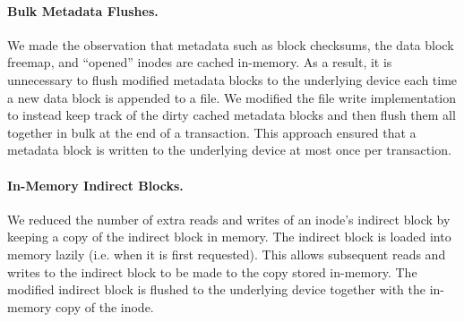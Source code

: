 \paragraph{Bulk Metadata Flushes.}
We made the observation that metadata such as block checksums, the data
block freemap, and ``opened'' inodes are cached in-memory. As a result, it is
unnecessary to flush modified metadata blocks to the underlying device each
time a new data block is appended to a file. We modified the file write
implementation to instead keep track of the dirty cached metadata blocks and
then flush them all together in bulk at the end of a transaction. This approach
ensured that a metadata block is written to the underlying device at most once
per transaction.

\paragraph{In-Memory Indirect Blocks.}
We reduced the number of extra reads and writes of an inode's indirect block by
keeping a copy of the indirect block in memory. The indirect block is loaded
into memory lazily (i.e. when it is first requested). This allows subsequent
reads and writes to the indirect block to be made to the copy stored in-memory.
The modified indirect block is flushed to the underlying device together with
the in-memory copy of the inode.
